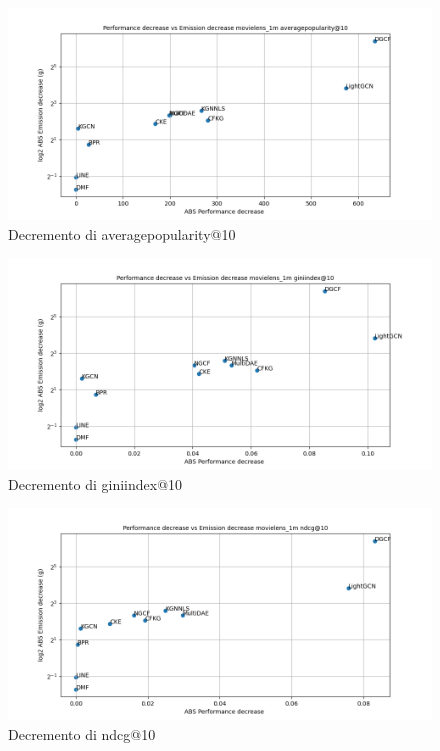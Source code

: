 \begin{figure}[H]
    \centering
     \includegraphics[width=\textwidth]{images/decrement_averagepopularity@10_movielens_1m_40_5.png}
    \caption{Decremento di averagepopularity@10}
\end{figure}

\begin{figure}[H]
    \centering
     \includegraphics[width=\textwidth]{images/decrement_giniindex@10_movielens_1m_40_5.png}
    \caption{Decremento di giniindex@10}
\end{figure}

\begin{figure}[H]
    \centering
     \includegraphics[width=\textwidth]{images/decrement_ndcg@10_movielens_1m_40_5.png}
    \caption{Decremento di ndcg@10}
\end{figure}

